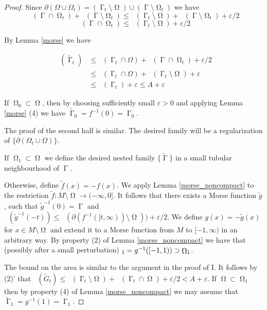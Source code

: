 \documentclass[12pt]{amsart}
\DeclareMathOperator{\Hn}{\mathcal{H}^n}
\DeclareMathOperator{\G}{\Gamma}
\DeclareMathOperator{\Om}{\Omega}
\theoremstyle{definition}
\begin{document}
\begin{proof}
    Since $\partial (\Omega \cup \Omega_t)
    = (\G_t \setminus \Om) \cup (\G \setminus \Om_t)$
    we have
    $$\Hn(\G \cap \Om_t) + \Hn(\G \setminus \Om_t) \leq \Hn(\G_t \setminus \Om )
    + \Hn(\G \setminus \Om_t) + \varepsilon/2$$
    $$\Hn(\G \cap \Om_t) \leq \Hn(\G_t \setminus \Om ) + \varepsilon/2$$
    
    By Lemma \ref*{morse} we have

\begin{align*}
\Hn(\tilde{\G}_t) & \leq \Hn( \G_t \cap \Omega) + \Hn( \G \cap \Om_t) + \varepsilon/2 \\
                & \leq \Hn( \G_t \cap \Omega) + \Hn(\G_t \setminus \Om ) + \varepsilon \\
                & \leq \Hn(\G_t) + \varepsilon \leq A + \varepsilon
\end{align*}

If $\Om_0 \subset \Om$, then by choosing 
sufficiently small $\varepsilon>0$ and applying
Lemma \ref*{morse} (4)
we have $\tilde{\G}_0 = f^{-1}(0) = \G_0$.

The proof of the second half is similar.
The desired family will be a regularization of
$\{\partial (\Omega_t \cup \Omega) \}$.

If $\Om_1 \subset \Om$ we define the desired nested family
$\{ \tilde{\G} \}$ in a small tubular neighbourhood of 
$\G$.

Otherwise, 
define $\tilde{f}(x) = -f(x)$.
We apply Lemma \ref*{morse_noncompact} 
to the restriction  $\tilde{f}: M \setminus \Om \rightarrow 
(-\infty, 0]$.
It follows that there exists a Morse function $\tilde{g}$,
such that
$\tilde{g}^{-1}(0) = \G$ and 
$\Hn(\tilde{g}^{-1}(-t)) \leq \Hn(\partial(f^{-1}([t,\infty))\setminus \Om))
+ \varepsilon/2$. We define $g(x) = - \tilde{g}(x)$ for
$x \in M \setminus \Om$ and extend it to a Morse function
from $M$ to $[-1, \infty)$ in an arbitrary way.
By property (2) of Lemma \ref*{morse_noncompact}
we have that (possibly after a small perturbation)
$\title{\Om}_1 = g^{-1}([-1,1)) \supset \Om_1$.

The bound on the area is similar to the 
argument in the proof of I.
It follows by (2)' that
$\Hn(\tilde{G}_t ) \leq \Hn(\G_t \setminus \Om) + \Hn(\G_t \cap \Om) + \varepsilon/2
< A+ \varepsilon$.
If $\Om \subset \Om_1$ then by property (4) of Lemma \ref*{morse_noncompact}
we may assume that $\tilde{\G}_1 = g^{-1}(1) = \G_1$.
\end{proof}
\end{document}
